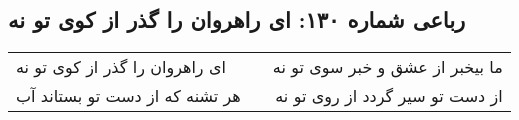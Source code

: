 \begin{center}
\section*{رباعی شماره ۱۳۰: ای راهروان را گذر از کوی تو نه}
\label{sec:130}
\begin{longtable}{l p{0.5cm} r}
ای راهروان را گذر از کوی تو نه
&&
ما بیخبر از عشق و خبر سوی تو نه
\\
هر تشنه که از دست تو بستاند آب
&&
از دست تو سیر گردد از روی تو نه
\\
\end{longtable}
\end{center}
